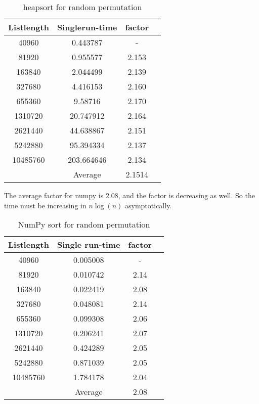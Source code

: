 \documentclass[sigconf, nonacm, natbib, screen, balance=False]{acmart}
\begin{document}
\begin{table}[ht]
\caption{heapsort for random permutation }
\label{tab:table2}
\begin{center}
\begin{tabular}{|c|c|c|c|} 
\hline
\textbf{Listlength} & 	\textbf{Singlerun-time} & \textbf{factor} \\ 
\hline
40960 & 	0.443787 & 	- \\ 
81920 & 	0.955577 & 	2.153 \\ 
163840 & 	2.044499 & 	2.139 \\ 
327680 & 	4.416153 & 	2.160 \\ 
655360 & 	9.58716 & 	2.170 \\ 
1310720 & 	20.747912 & 	2.164 \\ 
2621440 & 	44.638867 & 	2.151 \\ 
5242880 & 	95.394334 & 	2.137 \\ 
10485760 & 	203.664646 & 	2.134 \\ 
\hline
	 & 	Average & 	2.1514 \\ 	
\hline
\end{tabular}
\end{center}
\end{table}

The average factor for numpy is $2.08$, and the factor is decreasing as well. So the time must be increasing in $n\log\left(n\right)$ asymptotically. 

\begin{table}[ht]
\caption{NumPy sort for random permutation }
\label{tab:table3}
\begin{center}
\begin{tabular}{|c|c|c|c|} 
\hline
\textbf{Listlength} & 	\textbf{Single run-time} & \textbf{factor} \\ 
\hline
	40960 & 	0.005008 & 	- \\ 
	81920 & 	0.010742 & 	2.14 \\ 
	163840 & 	0.022419 & 	2.08 \\ 
	327680 & 	0.048081 & 	2.14 \\ 
	655360 & 	0.099308 & 	2.06 \\ 
	1310720 & 	0.206241 & 	2.07 \\ 
	2621440 & 	0.424289 & 	2.05 \\ 
	5242880 & 	0.871039 & 	2.05 \\ 
	10485760 & 	1.784178 & 	2.04 \\ 
\hline
	 & 	Average & 	2.08 \\ 	
\hline
\end{tabular}
\end{center}
\end{table}
\end{document}
